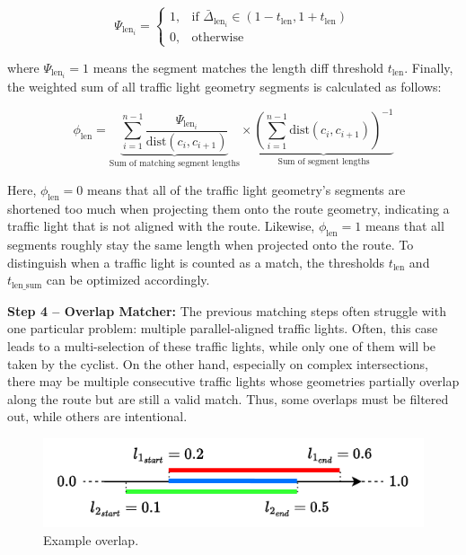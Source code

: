 \begin{equation}
\Psi_{\text{len}_i} = 
    \begin{cases}
            1,& \text{if } \bar{\Delta}_{\text{len}_{i}} \in \left(1 - t_{\text{len}}, 1 + t_{\text{len}}\right)\\
            0,              & \text{otherwise}
        \end{cases}
\end{equation}

where $\Psi_{\text{len}_i} = 1$ means the segment matches the length diff threshold $t_{\text{len}}$. Finally, the weighted sum of all traffic light geometry segments is calculated as follows:

\begin{equation} 
\phi_{\text{len}} = 
    \underbrace{\sum_{i=1}^{n-1} 
    \frac{\Psi_{\text{len}_i}}{\text{dist}(c_i, c_{i+1})}}_{\text{Sum of matching segment lengths}}
    \times
    \underbrace{(\sum_{i=1}^{n-1} \text{dist}(c_i, c_{i+1}))^{-1}}_{\text{Sum of segment lengths}}
\end{equation}

Here, $\phi_{\text{len}} = 0$ means that all of the traffic light geometry's segments are shortened too much when projecting them onto the route geometry, indicating a traffic light that is not aligned with the route. Likewise, $\phi_{\text{len}} = 1$ means that all segments roughly stay the same length when projected onto the route. To distinguish when a traffic light is counted as a match, the thresholds $t_{\text{len}}$ and $t_{\text{len\_sum}}$ can be optimized accordingly.

\textbf{\color{cidarkblue}Step 4 -- Overlap Matcher:} The previous matching steps often struggle with one particular problem: multiple parallel-aligned traffic lights. Often, this case leads to a multi-selection of these traffic lights, while only one of them will be taken by the cyclist. On the other hand, especially on complex intersections, there may be multiple consecutive traffic lights whose geometries partially overlap along the route but are still a valid match. Thus, some overlaps must be filtered out, while others are intentional.

\begin{figure}[b]
\centering
\includegraphics[width=0.5\linewidth]{images/overlap.drawio.pdf}
\caption{Example overlap.}
\label{fig:sg-matching-overlap-filter}
\end{figure}

